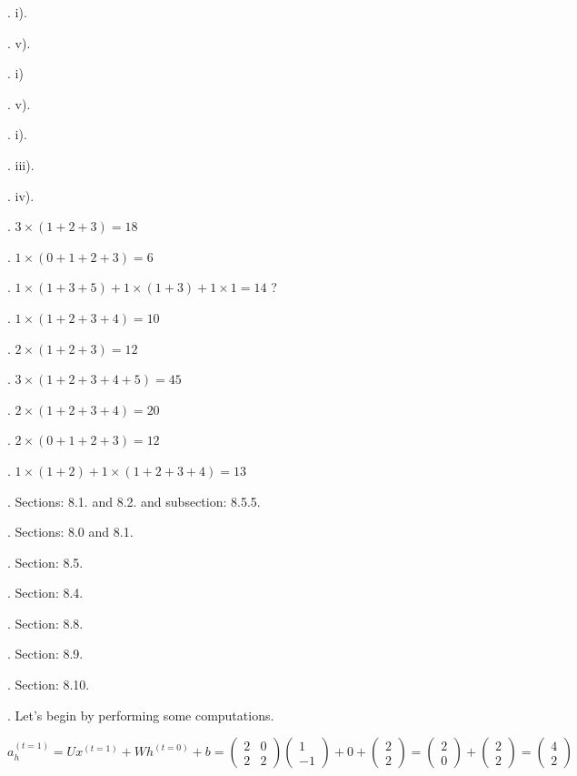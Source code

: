. i).

. v).

. i)

. v).

. i).

. iii).

. iv).

. $3 \times (1 + 2 + 3) = 18$

. $1 \times (0 + 1 + 2 + 3) = 6 $

. $ 1 \times (1 + 3 + 5) + 1 \times (1 + 3) + 1 \times 1 = 14$ ?

. $ 1 \times (1 + 2 + 3 + 4) = 10 $

. $ 2 \times (1 + 2 + 3) = 12 $

. $ 3 \times (1 + 2 + 3 + 4 + 5) = 45 $

. $ 2\times (1 + 2 + 3 + 4) = 20 $

. $ 2\times (0 + 1 + 2 + 3) = 12 $

. $ 1\times (1 + 2) + 1 \times (1 + 2 + 3 + 4) = 13 $

. Sections: 8.1. and 8.2. and subsection: 8.5.5.

. Sections: 8.0 and 8.1.

. Section: 8.5.

. Section: 8.4.

. Section: 8.8.

. Section: 8.9.

. Section: 8.10.

. Let's begin by performing some computations.

$$ a_h^{(t=1)} = U x^{(t=1)} + W h^{(t=0)} + b = \begin{pmatrix} 2 & 0 \\ 2 & 2 \end{pmatrix} \begin{pmatrix} 1 \\ -1 \end{pmatrix} + 0 + \begin{pmatrix} 2 \\ 2 \end{pmatrix} = \begin{pmatrix} 2 \\ 0 \end{pmatrix} + \begin{pmatrix} 2 \\ 2 \end{pmatrix} = \begin{pmatrix} 4 \\ 2 \end{pmatrix} $$

